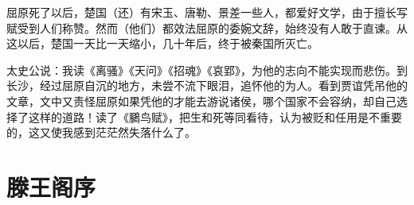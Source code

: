 \documentclass[12pt,UTF-8,openany,a4]{ctexbook}
\begin{document}
\begin{large}
    屈原死了以后，楚国（还）有宋玉、唐勒、景差一些人，都爱好文学，由于擅长写赋受到人们称赞。然而（他们）都效法屈原的委婉文辞，始终没有人敢于直谏。从这以后，楚国一天比一天缩小，几十年后，终于被秦国所灭亡。
    
    太史公说：我读《离骚》《天问》《招魂》《哀郢》，为他的志向不能实现而悲伤。到长沙，经过屈原自沉的地方，未尝不流下眼泪，追怀他的为人。看到贾谊凭吊他的文章，文中又责怪屈原如果凭他的才能去游说诸侯，哪个国家不会容纳，却自己选择了这样的道路！读了《鵩鸟赋》，把生和死等同看待，认为被贬和任用是不重要的，这又使我感到茫茫然失落什么了。
    

\end{large}



\chapter{滕王阁序}
\end{document}
